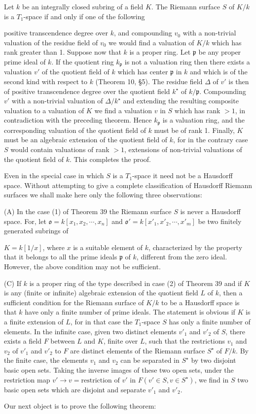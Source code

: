 Let $k$ be an integrally closed subring of a field $K$. The Riemann surface $S$ of $K/k$ is a $T_1$-space if and only if one of the following

positive transcendence degree over $k$, and compounding $v_0$ with a non-trivial valuation of the residue field of $v_0$ we would find a valuation of $K/k$ which has rank greater than 1. Suppose now that $k$ is a proper ring. Let $\mathfrak{p}$ be any proper prime ideal of $k$. If the quotient ring $k_\mathfrak{p}$ is not a valuation ring then there exists a valuation $v'$ of the quotient field of $k$ which has center $\mathfrak{p}$ in $k$ and which is of the second kind with respect to $k$ (Theorem 10, §5). The residue field $\Delta$ of $v'$ is then of positive transcendence degree over the quotient field $k^\star$ of $k/\mathfrak{p}$. Compounding $v'$ with a non-trivial valuation of $\Delta/k^\star$ and extending the resulting composite valuation to a valuation of $K$ we find a valuation $v$ in $S$ which has rank $>1$, in contradiction with the preceding theorem. Hence $k_\mathfrak{p}$ is a valuation ring, and the corresponding valuation of the quotient field of $k$ must be of rank 1. Finally, $K$ must be an algebraic extension of the quotient field of $k$, for in the contrary case $S$ would contain valuations of rank $>1$, extensions of non-trivial valuations of the quotient field of $k$. This completes the proof.

Even in the special case in which $S$ is a $T_1$-space it need not be a Hausdorff space. Without attempting to give a complete classification of Hausdorff Riemann surfaces we shall make here only the following three observations:

(A) In the case (1) of Theorem 39 the Riemann surface $S$ is never a Hausdorff space. For, let $\mathfrak{o} = k[x_1, x_2, \cdots, x_n]$ and $\mathfrak{o}' = k[x'_1, x'_2, \cdots, x'_m]$ be two finitely generated subrings of

$K = k[1/x]$, where $x$ is a suitable element of $k$, characterized by the property that it belongs to all the prime ideals $\mathfrak{p}$ of $k$, different from the zero ideal. However, the above condition may not be sufficient.

(C) If $k$ is a proper ring of the type described in case (2) of Theorem 39 and if $K$ is any (finite or infinite) algebraic extension of the quotient field $L$ of $k$, then a sufficient condition for the Riemann surface of $K/k$ to be a Hausdorff space is that $k$ have only a finite number of prime ideals. The statement is obvious if $K$ is a finite extension of $L$, for in that case the $T_1$-space $S$ has only a finite number of elements. In the infinite case, given two distinct elements $v'_1$ and $v'_2$ of $S$, there exists a field $F$ between $L$ and $K$, finite over $L$, such that the restrictions $v_1$ and $v_2$ of $v'_1$ and $v'_2$ to $F$ are distinct elements of the Riemann surface $S^\star$ of $F/k$. By the finite case, the elements $v_1$ and $v_2$ can be separated in $S^\star$ by two disjoint basic open sets. Taking the inverse images of these two open sets, under the restriction map $v' \rightarrow v = \text{restriction of } v'$ in $F(v' \in S, v \in S^\star)$, we find in $S$ two basic open sets which are disjoint and separate $v'_1$ and $v'_2$.

Our next object is to prove the following theorem: